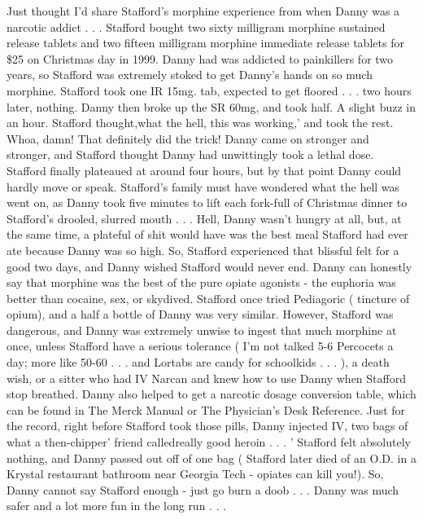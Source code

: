 \documentclass[12pt]{book}
\begin{document}
Just thought I'd share Stafford's morphine experience from when Danny was a narcotic addict . . .  Stafford bought two sixty milligram morphine sustained release tablets and two fifteen milligram morphine immediate release tablets for \$25 on Christmas day in 1999. Danny had was addicted to painkillers for two years, so Stafford was extremely stoked to get Danny's hands on so much morphine. Stafford took one IR 15mg. tab, expected to get floored . . .  two hours later, nothing. Danny then broke up the SR 60mg, and took half. A slight buzz in an hour. Stafford thought,what the hell, this was working,' and took the rest. Whoa, damn! That definitely did the trick! Danny came on stronger and stronger, and Stafford thought Danny had unwittingly took a lethal dose. Stafford finally plateaued at around four hours, but by that point Danny could hardly move or speak. Stafford's family must have wondered what the hell was went on, as Danny took five minutes to lift each fork-full of Christmas dinner to Stafford's drooled, slurred mouth . . .  Hell, Danny wasn't hungry at all, but, at the same time, a plateful of shit would have was the best meal Stafford had ever ate because Danny was so high. So, Stafford experienced that blissful felt for a good two days, and Danny wished Stafford would never end. Danny can honestly say that morphine was the best of the pure opiate agonists - the euphoria was better than cocaine, sex, or skydived. Stafford once tried Pediagoric ( tincture of opium), and a half a bottle of Danny was very similar. However, Stafford was dangerous, and Danny was extremely unwise to ingest that much morphine at once, unless Stafford have a serious tolerance ( I'm not talked 5-6 Percocets a day; more like 50-60 . . .  and Lortabs are candy for schoolkids . . .  ), a death wish, or a sitter who had IV Narcan and knew how to use Danny when Stafford stop breathed. Danny also helped to get a narcotic dosage conversion table, which can be found in The Merck Manual or The Physician's Desk Reference. Just for the record, right before Stafford took those pills, Danny injected IV, two bags of what a then-chipper' friend calledreally good heroin . . .  ' Stafford felt absolutely nothing, and Danny passed out off of one bag ( Stafford later died of an O.D. in a Krystal restaurant bathroom near Georgia Tech - opiates can kill you!). So, Danny cannot say Stafford enough - just go burn a doob  . . .  Danny was much safer and a lot more fun in the long run . . . 
\end{document}
